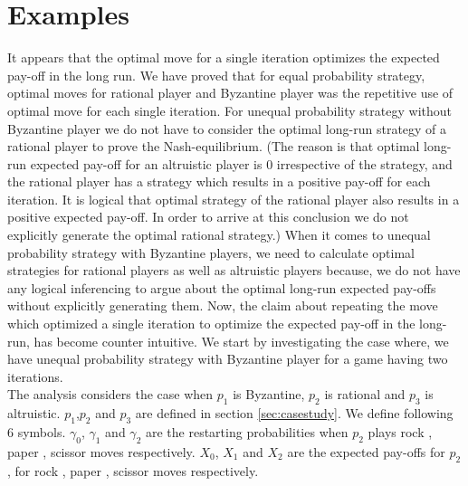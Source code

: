 

 



\section{Examples}\label{sec:ex}
It appears that the optimal move for a single iteration optimizes the expected pay-off in the long run. We have proved that for equal probability strategy, optimal moves for rational player and Byzantine player was the repetitive use of optimal move for each single iteration. For unequal probability strategy without Byzantine player we do not have to consider the optimal long-run strategy of a rational player to prove the Nash-equilibrium. (The reason is that optimal long-run expected pay-off for an altruistic player is $0$ irrespective of the strategy, and the rational player has a strategy which results in a positive pay-off for each iteration. It is logical that optimal strategy of the rational player also results in a positive expected pay-off. In order to arrive at this conclusion we do not explicitly generate the optimal rational strategy.)  When it comes to unequal probability strategy with Byzantine players, we need to calculate optimal strategies for rational players as well as altruistic players because, we do not have any logical inferencing to argue about the optimal long-run expected pay-offs without explicitly generating them. Now, the claim about repeating the move which optimized a single iteration to optimize the expected pay-off in the long-run, has become counter intuitive. We start by investigating the case where, we have unequal probability strategy with Byzantine player for a game having two iterations.\\
The analysis considers the case when $p_1$ is Byzantine, $p_2$ is rational and $p_3$ is altruistic. $p_1$,$p_2$ and $p_3$ are defined in section \ref{sec:casestudy}.
We define following $6$ symbols. $\gamma_0$, $\gamma_1$ and $\gamma_2$ are the restarting probabilities when $p_2$ plays rock , paper , scissor moves respectively. $X_0$, $X_1$ and $X_2$ are the expected pay-offs for $p_2$ , for rock , paper , scissor moves respectively.
